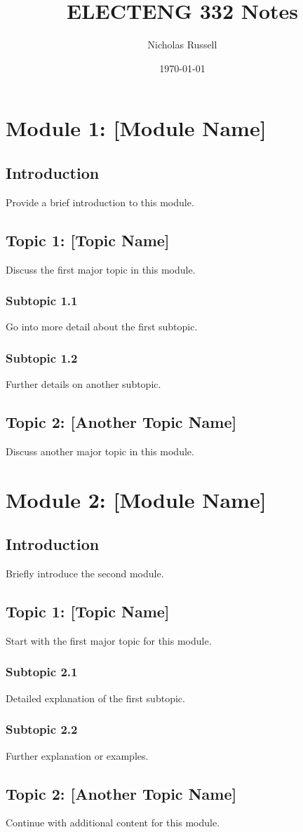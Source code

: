 \documentclass[12pt]{report}
\title{ELECTENG 332 Notes}
\author{Nicholas Russell}
\date{\today}
\begin{document}
\maketitle
\tableofcontents
\newpage

\chapter{Module 1: [Module Name]}
\section{Introduction}
Provide a brief introduction to this module.

\section{Topic 1: [Topic Name]}
Discuss the first major topic in this module.

\subsection{Subtopic 1.1}
Go into more detail about the first subtopic.

\subsection{Subtopic 1.2}
Further details on another subtopic.

\section{Topic 2: [Another Topic Name]}
Discuss another major topic in this module.

\clearpage

\chapter{Module 2: [Module Name]}
\section{Introduction}
Briefly introduce the second module.

\section{Topic 1: [Topic Name]}
Start with the first major topic for this module.

\subsection{Subtopic 2.1}
Detailed explanation of the first subtopic.

\subsection{Subtopic 2.2}
Further explanation or examples.

\section{Topic 2: [Another Topic Name]}
Continue with additional content for this module.

\end{document}
